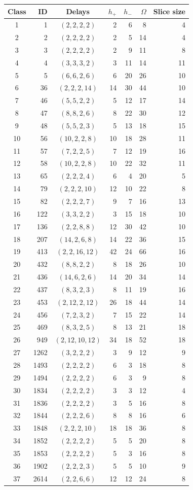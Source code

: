 \begin{tabular}{@{}crcrrrr@{}}
\toprule
Class & ID & Delays & $h_+$ & $h_-$ & $\Omega$ & Slice size\\
\midrule
1 & 1 & $(2,2,2,2)$ & 2 & 6 & 8 & 4\\
2 & 2 & $(2,2,2,2)$ & 2 & 5 & 14 & 4\\
3 & 3 & $(2,2,2,2)$ & 2 & 9 & 11 & 8\\
4 & 4 & $(3,3,3,2)$ & 3 & 11 & 14 & 11\\
5 & 5 & $(6,6,2,6)$ & 6 & 20 & 26 & 10\\
6 & 36 & $(2,2,2,14)$ & 14 & 30 & 44 & 10\\
7 & 46 & $(5,5,2,2)$ & 5 & 12 & 17 & 14\\
8 & 47 & $(8,8,2,6)$ & 8 & 22 & 30 & 12\\
9 & 48 & $(5,5,2,3)$ & 5 & 13 & 18 & 15\\
10 & 56 & $(10,2,2,8)$ & 10 & 18 & 28 & 11\\
11 & 57 & $(7,2,2,5)$ & 7 & 12 & 19 & 16\\
12 & 58 & $(10,2,2,8)$ & 10 & 22 & 32 & 11\\
13 & 65 & $(2,2,2,4)$ & 6 & 4 & 20 & 5\\
14 & 79 & $(2,2,2,10)$ & 12 & 10 & 22 & 8\\
15 & 82 & $(2,2,2,7)$ & 9 & 7 & 16 & 13\\
16 & 122 & $(3,3,2,2)$ & 3 & 15 & 18 & 10\\
17 & 136 & $(2,2,8,8)$ & 12 & 30 & 42 & 10\\
18 & 207 & $(14,2,6,8)$ & 14 & 22 & 36 & 15\\
19 & 413 & $(2,2,16,12)$ & 42 & 24 & 66 & 16\\
20 & 432 & $(8,8,2,2)$ & 8 & 18 & 26 & 10\\
21 & 436 & $(14,6,2,6)$ & 14 & 20 & 34 & 14\\
22 & 437 & $(8,3,2,3)$ & 8 & 11 & 19 & 16\\
23 & 453 & $(2,12,2,12)$ & 26 & 18 & 44 & 14\\
24 & 456 & $(7,2,3,2)$ & 7 & 15 & 22 & 14\\
25 & 469 & $(8,3,2,5)$ & 8 & 13 & 21 & 18\\
26 & 949 & $(2,12,10,12)$ & 34 & 18 & 52 & 18\\
27 & 1262 & $(3,2,2,2)$ & 3 & 9 & 12 & 9\\
28 & 1493 & $(2,2,2,2)$ & 6 & 3 & 18 & 8\\
29 & 1494 & $(2,2,2,2)$ & 6 & 3 & 9 & 8\\
30 & 1834 & $(2,2,2,2)$ & 3 & 3 & 12 & 4\\
31 & 1836 & $(2,2,2,2)$ & 3 & 5 & 16 & 8\\
32 & 1844 & $(2,2,2,6)$ & 8 & 8 & 16 & 6\\
33 & 1848 & $(2,2,2,10)$ & 18 & 18 & 36 & 8\\
34 & 1852 & $(2,2,2,2)$ & 5 & 5 & 20 & 8\\
35 & 1853 & $(2,2,2,2)$ & 5 & 3 & 16 & 8\\
36 & 1902 & $(2,2,2,3)$ & 5 & 5 & 10 & 9\\
37 & 2614 & $(2,2,6,6)$ & 12 & 12 & 24 & 8\\
\bottomrule
\end{tabular}
